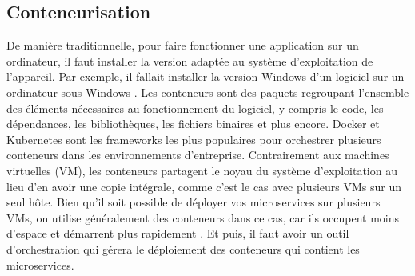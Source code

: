 \documentclass{template}
\begin{document}
\subsection{Conteneurisation}

De manière traditionnelle, pour faire fonctionner une application sur un ordinateur, il faut installer la version adaptée au système d'exploitation de l'appareil. Par exemple, il fallait installer la version Windows d'un logiciel sur un ordinateur sous Windows \cite{amazonQuestceConteneurisation}. Les conteneurs sont des paquets regroupant l'ensemble des éléments nécessaires au fonctionnement du logiciel, y compris le code, les dépendances, les bibliothèques, les fichiers binaires et plus encore. Docker et Kubernetes sont les frameworks les plus populaires pour orchestrer plusieurs conteneurs dans les environnements d'entreprise. Contrairement aux machines virtuelles (VM), les conteneurs partagent le noyau du système d'exploitation au lieu d'en avoir une copie intégrale, comme c'est le cas avec plusieurs VMs sur un seul hôte. Bien qu'il soit possible de déployer vos microservices sur plusieurs VMs, on utilise généralement des conteneurs dans ce cas, car ils occupent moins d'espace et démarrent plus rapidement \cite{ibmDeveloper}. Et puis, il faut avoir un outil d'orchestration qui gérera le déploiement des conteneurs qui contient les microservices.
\end{document}
